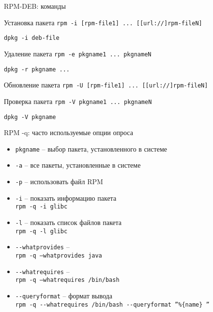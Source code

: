 \begin{frame}{RPM-DEB: команды}
	\begin{block}{Установка пакета}
		{\tt rpm -i [rpm-file1] ... [[url://]rpm-fileN] }
        
        {\tt dpkg -i deb-file }
	\end{block}
	\begin{block}{Удаление пакета}
		{\tt rpm -e pkgname1 ... pkgnameN }
        
        {\tt dpkg -r pkgname ... }
	\end{block}
	\begin{block}{Обновление пакета}
		{\tt rpm -U [rpm-file1] ... [[url://]rpm-fileN] }
	\end{block}
	\begin{block}{Проверка пакета}
		{\tt rpm -V pkgname1 ... pkgnameN }

        {\tt dpkg -V pkgname }
	\end{block}
\end{frame}

\begin{frame}{RPM -q: часто используемые опции опроса}

	\begin{itemize}
		\item {\tt pkgname} -- выбор пакета, установленного в системе
		\item {\tt -a} -- все пакеты, установленные в системе
		\item {\tt -p} -- использовать файл RPM
	\end{itemize}


	\begin{itemize}
		\item {\tt -i} -- показать информацию пакета\\
			{\tt rpm -q -i glibc }
		\item {\tt -l} -- показать список файлов пакета \\
			{\tt rpm -q -l glibc }
		\item {\tt -{}-whatprovides} -- \\
			{\tt rpm -q --whatprovides java}
		\item {\tt -{}-whatrequires} -- \\
			{\tt rpm -q --whatrequires /bin/bash}
		\item {\tt -{}-queryformat} -- формат вывода\\
			{\tt rpm -q -{}-whatrequires /bin/bash -{}-queryformat ''\%\{name\} ''}

	\end{itemize}

\end{frame}

